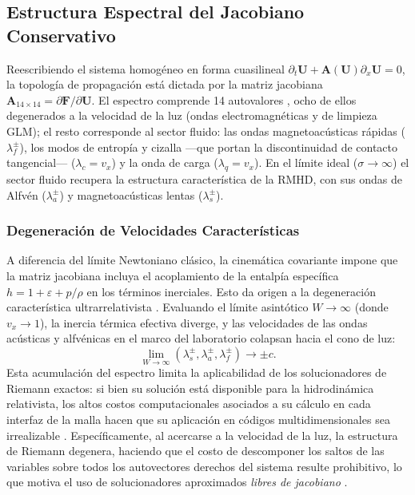 \subsection{Estructura Espectral del Jacobiano Conservativo}

\primerparrafo Reescribiendo el sistema homogéneo en forma cuasilineal $\partial_t \mathbf{U} + \mathbf{A}(\mathbf{U}) \partial_x \mathbf{U} = 0$, la topología de propagación está dictada por la matriz jacobiana $\mathbf{A}_{14\times14} = \partial \mathbf{F} / \partial \mathbf{U}$. El espectro comprende 14 autovalores \parencite{miranda-aranguren-2018}, ocho de ellos degenerados a la velocidad de la luz (ondas electromagnéticas y de limpieza GLM); el resto corresponde al sector fluido: las ondas magnetoacústicas rápidas ($\lambda_f^\pm$), los modos de entropía y cizalla ---que portan la discontinuidad de contacto tangencial--- ($\lambda_c = v_x$) y la onda de carga ($\lambda_q = v_x$). En el límite ideal ($\sigma\to\infty$) el sector fluido recupera la estructura característica de la RMHD, con sus ondas de Alfvén ($\lambda_a^\pm$) y magnetoacústicas lentas ($\lambda_s^\pm$).

\subsubsection{Degeneración de Velocidades Características}

\primerparrafo A diferencia del límite Newtoniano clásico, la cinemática covariante impone que la matriz jacobiana incluya el acoplamiento de la entalpía específica $h = 1 + \varepsilon + p/\rho$ en los términos inerciales. Esto da origen a la degeneración característica ultrarrelativista \parencite{rezzolla-2013}. Evaluando el límite asintótico $W \to \infty$ (donde $v_x \to 1$), la inercia térmica efectiva diverge, y las velocidades de las ondas acústicas y alfvénicas en el marco del laboratorio colapsan hacia el cono de luz:
$$
\lim_{W \to \infty} (\lambda_s^\pm, \lambda_a^\pm, \lambda_f^\pm) \rightarrow \pm c.
$$
Esta acumulación del espectro limita la aplicabilidad de los solucionadores de Riemann exactos: si bien su solución está disponible para la hidrodinámica relativista, los altos costos computacionales asociados a su cálculo en cada interfaz de la malla hacen que su aplicación en códigos multidimensionales sea irrealizable \parencite{rezzolla-2013}. Específicamente, al acercarse a la velocidad de la luz, la estructura de Riemann degenera, haciendo que el costo de descomponer los saltos de las variables sobre todos los autovectores derechos del sistema resulte prohibitivo, lo que motiva el uso de solucionadores aproximados \emph{libres de jacobiano} \parencite{miranda-aranguren-2018}. 

